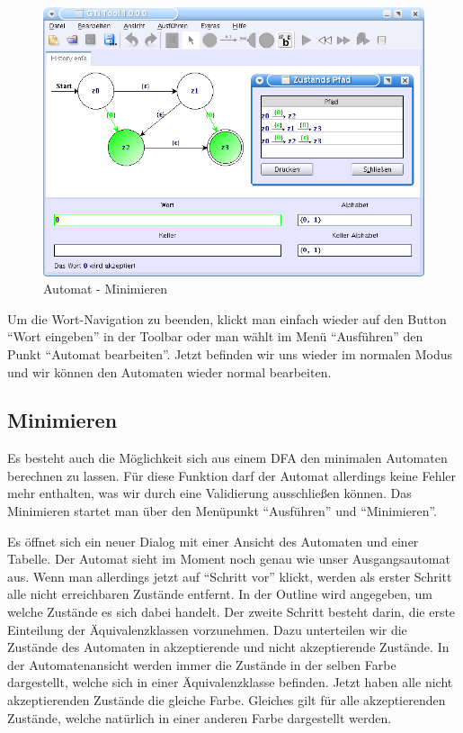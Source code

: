   \begin{figure}[h]
  \begin{center}
  \includegraphics[width=12cm]{../images/history_path.png}
  \caption{Automat - Minimieren}
  \end{center}
  \end{figure}
  
  Um die Wort-Navigation zu beenden, klickt man einfach wieder auf den Button
  "`Wort eingeben"' in der Toolbar oder man wählt im Menü "`Ausführen"' den
  Punkt "`Automat bearbeiten"'. Jetzt befinden wir uns wieder im normalen Modus
  und wir können den Automaten wieder normal bearbeiten.
   
\subsection{Minimieren}
  
  Es besteht auch die Möglichkeit sich aus einem DFA den minimalen Automaten
  berechnen zu lassen. Für diese Funktion darf der Automat allerdings keine
  Fehler mehr enthalten, was wir durch eine Validierung ausschließen können. Das
  Minimieren startet man über den Menüpunkt "`Ausführen"' und
  "`Minimieren"'.\vspace{10pt}
  
  Es öffnet sich ein neuer Dialog mit einer Ansicht des Automaten und einer
  Tabelle. Der Automat sieht im Moment noch genau wie unser Ausgangsautomat
  aus. Wenn man allerdings jetzt auf "`Schritt vor"' klickt, werden als erster
  Schritt alle nicht erreichbaren Zustände entfernt. In der Outline wird
  angegeben, um welche Zustände es sich dabei handelt. Der zweite Schritt
  besteht darin, die erste Einteilung der Äquivalenzklassen vorzunehmen. Dazu
  unterteilen wir die Zustände des Automaten in akzeptierende und nicht
  akzeptierende Zustände. In der Automatenansicht werden immer die Zustände in
  der selben Farbe dargestellt, welche sich in einer Äquivalenzklasse befinden.
  Jetzt haben alle nicht akzeptierenden Zustände die gleiche Farbe. Gleiches 
  gilt für alle akzeptierenden Zustände, welche natürlich in einer anderen
  Farbe dargestellt werden.\vspace{10pt}
  
